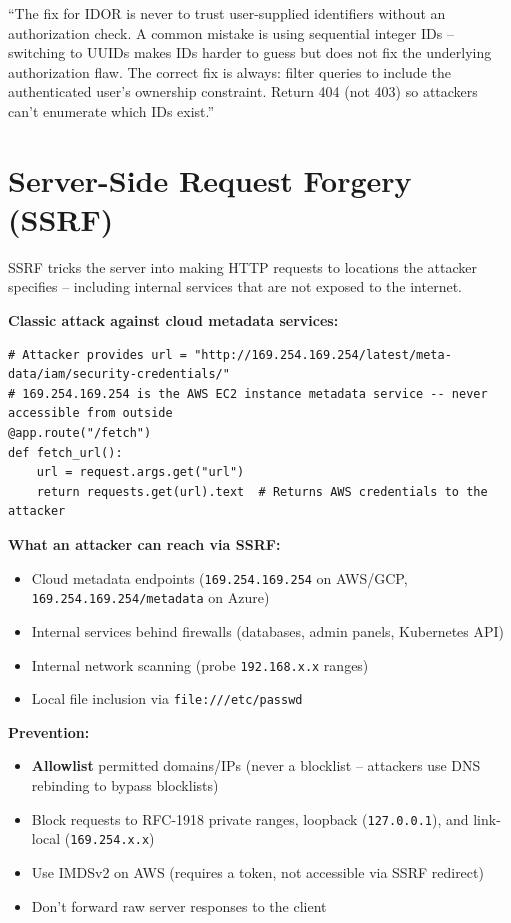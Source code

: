 \documentclass[11pt, letterpaper]{article}
\newcommand{\talkingpoint}[1]{%
  \begin{tcolorbox}[colback=talkbg, colframe=talkborder,
    title={\bfseries Interview Talking Point}, arc=3pt, boxrule=1pt]
  #1
  \end{tcolorbox}%
}
\begin{document}
\talkingpoint{``The fix for IDOR is never to trust user-supplied identifiers without an authorization check. A common mistake is using sequential integer IDs -- switching to UUIDs makes IDs harder to guess but does not fix the underlying authorization flaw. The correct fix is always: filter queries to include the authenticated user's ownership constraint. Return 404 (not 403) so attackers can't enumerate which IDs exist.''}

\section*{Server-Side Request Forgery (SSRF)}

SSRF tricks the server into making HTTP requests to locations the attacker specifies -- including internal services that are not exposed to the internet.

\textbf{Classic attack against cloud metadata services:}

\begin{lstlisting}[style=vuln, caption={VULNERABLE: server fetches a URL provided by the user}]
# Attacker provides url = "http://169.254.169.254/latest/meta-data/iam/security-credentials/"
# 169.254.169.254 is the AWS EC2 instance metadata service -- never accessible from outside
@app.route("/fetch")
def fetch_url():
    url = request.args.get("url")
    return requests.get(url).text  # Returns AWS credentials to the attacker
\end{lstlisting}

\textbf{What an attacker can reach via SSRF:}
\begin{itemize}[noitemsep]
  \item Cloud metadata endpoints (\texttt{169.254.169.254} on AWS/GCP, \texttt{169.254.169.254/metadata} on Azure)
  \item Internal services behind firewalls (databases, admin panels, Kubernetes API)
  \item Internal network scanning (probe \texttt{192.168.x.x} ranges)
  \item Local file inclusion via \texttt{file:///etc/passwd}
\end{itemize}

\textbf{Prevention:}
\begin{itemize}[noitemsep]
  \item \textbf{Allowlist} permitted domains/IPs (never a blocklist -- attackers use DNS rebinding to bypass blocklists)
  \item Block requests to RFC-1918 private ranges, loopback (\texttt{127.0.0.1}), and link-local (\texttt{169.254.x.x})
  \item Use IMDSv2 on AWS (requires a token, not accessible via SSRF redirect)
  \item Don't forward raw server responses to the client
\end{itemize}
\end{document}
